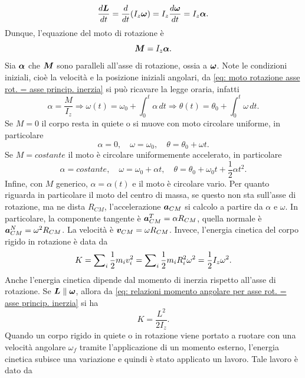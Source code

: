 \begin{equation}
    \frac{d\bm{L}}{dt}=\frac{d}{dt}(I_z\bm{\omega})=I_z\frac{d\bm{\omega}}{dt}=I_z\bm{\alpha}.
\end{equation}
Dunque, l'equazione del moto di rotazione è
\begin{equation}
\label{eq: moto rotazione asse rot. = asse princip. inerzia}
    \bm{M}=I_z\bm{\alpha}.
\end{equation}
Sia $\bm{\alpha}$ che $\bm{M}$ sono paralleli all'asse di rotazione, ossia a $\bm{\omega}$. Note le condizioni iniziali, cioè la velocità e la posizione iniziali angolari, da \eqref{eq: moto rotazione asse rot. = asse princip. inerzia} si può ricavare la legge oraria, infatti
\begin{equation}
    \alpha=\frac{M}{I_z}\Rightarrow\omega(t)=\omega_0+\int_0^t\alpha\,dt\Rightarrow\theta(t)=\theta_0+\int_0^t\omega\,dt.
\end{equation}
Se $M=0$ il corpo resta in quiete o si muove con moto circolare uniforme, in particolare
\begin{equation}
    \alpha=0,\quad\omega=\omega_0,\quad\theta=\theta_0+\omega t.
\end{equation}
Se $M=costante$ il moto è circolare uniformemente accelerato, in particolare
\begin{equation}
    \alpha=costante,\quad\omega=\omega_0+\alpha t,\quad\theta=\theta_0+\omega_0t+\frac{1}{2}\alpha t^2.
\end{equation}
Infine, con $M$ generico, $\alpha=\alpha(t)$ e il moto è circolare vario. Per quanto riguarda in particolare il moto del centro di massa, se questo non sta sull'asse di rotazione, ma ne dista $R_{CM}$, l'accelerazione $\bm{a}_{CM}$ si calcolo a partire da $\alpha$ e $\omega$. In particolare, la componente tangente è $\bm{a}_{CM}^{T}=\alpha R_{CM}$, quella normale è $\bm{a}_{CM}^N=\omega^2R_{CM}$. La velocità è $\bm{v}_{CM}=\omega R_{CM}$. Invece, l'energia cinetica del corpo rigido in rotazione è data da
\begin{equation}
\label{eq: energia cinetica rotazione corpo rigido}
    K=\sum\nolimits_i\frac{1}{2}m_iv_i^2=\sum\nolimits_i\frac{1}{2}m_iR_i^2\omega^2=\frac{1}{2}I_z\omega^2.
\end{equation}
Anche l'energia cinetica dipende dal momento di inerzia rispetto all'asse di rotazione. Se $\bm{L}\parallel\bm{\omega}$, allora da \eqref{eq: relazioni momento angolare per asse rot. = asse princip. inerzia} si ha
\begin{equation}
    K=\frac{L^2}{2I_z}.
\end{equation}
Quando un corpo rigido in quiete o in rotazione viene portato a ruotare con una velocità angolare $\omega_f$ tramite l'applicazione di un momento esterno, l'energia cinetica subisce una variazione e quindi è stato applicato un lavoro. Tale lavoro è dato da
